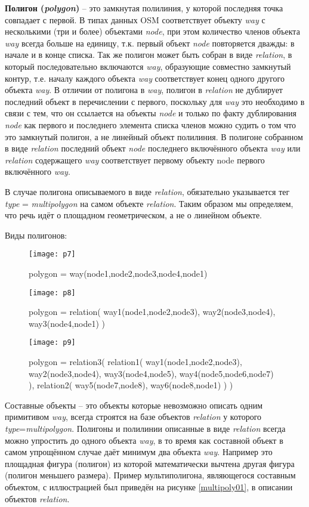 \textbf{Полигон (\emph{polygon})} -- это замкнутая полилиния, у которой 
последняя точка совпадает с первой. В типах данных OSM соответствует объекту 
\emph{way} с несколькими (три и более) объектами \emph{node}, при этом 
количество членов объекта \emph{way} всегда больше на единицу, т.к. первый 
объект \emph{node} повторяется дважды: в начале и в конце списка. Так же 
полигон может быть собран в виде \emph{relation}, в который последовательно 
включаются \emph{way}, образующие совместно замкнутый контур, т.е. началу 
каждого объекта \emph{way} соответствует конец одного другого объекта 
\emph{way}. В отличии от полигона в \emph{way}, полигон в \emph{relation} не 
дублирует последний объект в перечислении с первого, поскольку для \emph{way} 
это необходимо в связи с тем, что он ссылается на объекты \emph{node} и 
только по факту дублирования \emph{node} как первого и последнего элемента 
списка членов можно судить о том что это замкнутый полигон, а не линейный 
объект полилиния. В полигоне собранном в виде \emph{relation} последний объект 
\emph{node} последнего включённого объекта \emph{way} или \emph{relation} 
содержащего \emph{way} соответствует первому объекту node первого включённого 
\emph{way}.

В случае полигона описываемого в виде \emph{relation}, обязательно указывается 
тег \emph{type} = \emph{multipolygon} на самом объекте \emph{relation}. Таким 
образом мы определяем, что речь идёт о площадном геометрическом, а не о 
линейном объекте.

Виды полигонов:

\begin{figure}[ht!]
    \center
    \texttt{[image: p7]}
    \caption{polygon = way(node1,node2,node3,node4,node1)}
    \texttt{[image: p8]}
    \caption{polygon = relation( way1(node1,node2,node3), 
        way2(node3,node4), way3(node4,node1) )}
    \texttt{[image: p9]}
    \caption{polygon = relation3( relation1( way1(node1,node2,node3), 
        way2(node3,node4), way3(node4,node5), 
        way4(node5,node6,node7) ), relation2( way5(node7,node8), 
        way6(node8,node1) ) )}
\end{figure}

Составные объекты -- это объекты которые невозможно описать одним примитивом 
\emph{way}, всегда строятся на базе объектов \emph{relation} у которого 
\emph{type}=\emph{multipolygon}. Полигоны и полилинии описанные в виде 
\emph{relation} всегда можно упростить до одного объекта \emph{way}, в то 
время как составной объект в самом упрощённом случае даёт минимум два объекта 
\emph{way}. Например это площадная фигура (полигон) из которой математически 
вычтена другая фигура (полигон меньшего размера). Пример мультиполигона, 
являющегося составным объектом, с иллюстрацией был приведён на рисунке 
\ref{multipoly01}, в описании объектов \emph{relation}.


